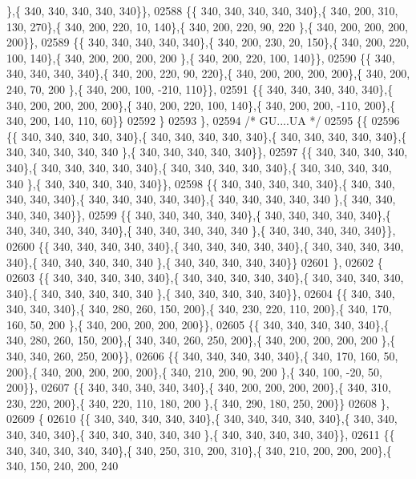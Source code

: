 \begin{DoxyCode}
      \},\{ 340, 340, 340, 340, 340\}\},
02588 \{\{ 340, 340, 340, 340, 340\},\{ 340, 200, 310, 130, 270\},\{ 340, 200, 220,  10, 140\},\{ 340, 200, 220,  90, 220
      \},\{ 340, 200, 200, 200, 200\}\},
02589 \{\{ 340, 340, 340, 340, 340\},\{ 340, 200, 230,  20, 150\},\{ 340, 200, 220, 100, 140\},\{ 340, 200, 200, 200, 200
      \},\{ 340, 200, 220, 100, 140\}\},
02590 \{\{ 340, 340, 340, 340, 340\},\{ 340, 200, 220,  90, 220\},\{ 340, 200, 200, 200, 200\},\{ 340, 200, 240,  70, 200
      \},\{ 340, 200, 100, -210, 110\}\},
02591 \{\{ 340, 340, 340, 340, 340\},\{ 340, 200, 200, 200, 200\},\{ 340, 200, 220, 100, 140\},\{ 340, 200, 200, -110, 
      200\},\{ 340, 200, 140, 110,  60\}\}
02592 \}
02593 \},
02594 \textcolor{comment}{/* GU....UA */}
02595 \{\{
02596 \{\{ 340, 340, 340, 340, 340\},\{ 340, 340, 340, 340, 340\},\{ 340, 340, 340, 340, 340\},\{ 340, 340, 340, 340, 340
      \},\{ 340, 340, 340, 340, 340\}\},
02597 \{\{ 340, 340, 340, 340, 340\},\{ 340, 340, 340, 340, 340\},\{ 340, 340, 340, 340, 340\},\{ 340, 340, 340, 340, 340
      \},\{ 340, 340, 340, 340, 340\}\},
02598 \{\{ 340, 340, 340, 340, 340\},\{ 340, 340, 340, 340, 340\},\{ 340, 340, 340, 340, 340\},\{ 340, 340, 340, 340, 340
      \},\{ 340, 340, 340, 340, 340\}\},
02599 \{\{ 340, 340, 340, 340, 340\},\{ 340, 340, 340, 340, 340\},\{ 340, 340, 340, 340, 340\},\{ 340, 340, 340, 340, 340
      \},\{ 340, 340, 340, 340, 340\}\},
02600 \{\{ 340, 340, 340, 340, 340\},\{ 340, 340, 340, 340, 340\},\{ 340, 340, 340, 340, 340\},\{ 340, 340, 340, 340, 340
      \},\{ 340, 340, 340, 340, 340\}\}
02601 \},
02602 \{
02603 \{\{ 340, 340, 340, 340, 340\},\{ 340, 340, 340, 340, 340\},\{ 340, 340, 340, 340, 340\},\{ 340, 340, 340, 340, 340
      \},\{ 340, 340, 340, 340, 340\}\},
02604 \{\{ 340, 340, 340, 340, 340\},\{ 340, 280, 260, 150, 200\},\{ 340, 230, 220, 110, 200\},\{ 340, 170, 160,  50, 200
      \},\{ 340, 200, 200, 200, 200\}\},
02605 \{\{ 340, 340, 340, 340, 340\},\{ 340, 280, 260, 150, 200\},\{ 340, 340, 260, 250, 200\},\{ 340, 200, 200, 200, 200
      \},\{ 340, 340, 260, 250, 200\}\},
02606 \{\{ 340, 340, 340, 340, 340\},\{ 340, 170, 160,  50, 200\},\{ 340, 200, 200, 200, 200\},\{ 340, 210, 200,  90, 200
      \},\{ 340, 100, -20,  50, 200\}\},
02607 \{\{ 340, 340, 340, 340, 340\},\{ 340, 200, 200, 200, 200\},\{ 340, 310, 230, 220, 200\},\{ 340, 220, 110, 180, 200
      \},\{ 340, 290, 180, 250, 200\}\}
02608 \},
02609 \{
02610 \{\{ 340, 340, 340, 340, 340\},\{ 340, 340, 340, 340, 340\},\{ 340, 340, 340, 340, 340\},\{ 340, 340, 340, 340, 340
      \},\{ 340, 340, 340, 340, 340\}\},
02611 \{\{ 340, 340, 340, 340, 340\},\{ 340, 250, 310, 200, 310\},\{ 340, 210, 200, 200, 200\},\{ 340, 150, 240, 200, 240

\end{DoxyCode}
